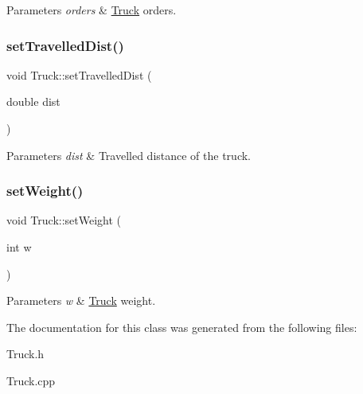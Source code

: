 \begin{DoxyParams}{Parameters}
{\em orders} & \hyperlink{class_truck}{Truck} orders. \\
\hline
\end{DoxyParams}
\mbox{\label{class_truck_a3a1cf7bfe48843206b8e20b4bd32782f}} 
\subsubsection{\texorpdfstring{set\+Travelled\+Dist()}{setTravelledDist()}}
{\footnotesize\ttfamily void Truck\+::set\+Travelled\+Dist (\begin{DoxyParamCaption}\item[{double}]{dist }\end{DoxyParamCaption})}


\begin{DoxyParams}{Parameters}
{\em dist} & Travelled distance of the truck. \\
\hline
\end{DoxyParams}
\mbox{\label{class_truck_acd688c98b6052bd720ade2e8eb8b3c8e}} 
\subsubsection{\texorpdfstring{set\+Weight()}{setWeight()}}
{\footnotesize\ttfamily void Truck\+::set\+Weight (\begin{DoxyParamCaption}\item[{int}]{w }\end{DoxyParamCaption})}


\begin{DoxyParams}{Parameters}
{\em w} & \hyperlink{class_truck}{Truck} weight. \\
\hline
\end{DoxyParams}


The documentation for this class was generated from the following files\+:\begin{DoxyCompactItemize}
\item 
Truck.\+h\item 
Truck.\+cpp\end{DoxyCompactItemize}
